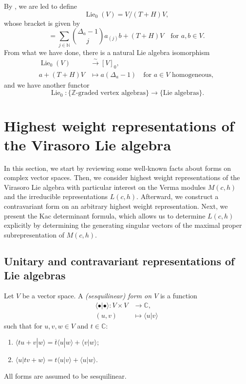 \documentclass[a4paper, 12pt, reqno]{amsart}
\theoremstyle{remark}
\DeclareMathOperator{\Lie}{Lie}
\begin{document}
By , we are led to define
\begin{equation*}
  \Lie_0(V) = V/(T + H)V,
\end{equation*}
whose bracket is given by
\begin{equation*}
  [a + (T + H)V, b + (T + H)V] = \sum_{j \in \mathbb{N}}\binom{\Delta_a - 1}{j}a_{(j)}b + (T + H)V \quad \text{for $a, b \in V$}.
\end{equation*}
From what we have done, there is a natural Lie algebra isomorphism
\begin{align*}
  \Lie_0(V) &\xrightarrow{\sim} [V]_0, \\
  a + (T + H)V &\mapsto a(\Delta_a - 1) \quad \text{for $a \in V$ homogeneous},
\end{align*}
and we have another functor
\begin{equation*}
  \Lie_0: \{\text{$\mathbb{Z}$-graded vertex algebras}\} \to \{\text{Lie algebras}\}.
\end{equation*}

\section{Highest weight representations of the Virasoro Lie algebra}
\label{sec:high-weight-repr}

In this section, we start by reviewing some well-known facts about forms on complex vector spaces.
Then, we consider highest weight representations of the Virasoro Lie algebra with particular interest on the Verma modules $M(c, h)$ and the irreducible representations $L(c, h)$.
Afterward, we construct a contravariant form on an arbitrary highest weight representation.
Next, we present the Kac determinant formula, which allows us to determine $L(c, h)$ explicitly by determining the generating singular vectors of the maximal proper subrepresentation of $M(c, h)$.

\subsection{Unitary and contravariant representations of Lie algebras}
\label{sec:unit-contr-repr}

Let $V$ be a vector space.
A \emph{(sesquilinear) form on $V$} is a function
\begin{align*}
  \langle \bullet| \bullet\rangle: V \times V &\to \mathbb{C}, \\
  (u, v) &\mapsto \langle u| v\rangle
\end{align*}
such that for $u, v, w \in V$ and $t \in \mathbb{C}$:
\begin{enumerate}
\item $\langle tu + v| w\rangle = \overline{t}\langle u| w\rangle + \langle v| w\rangle$;
\item $\langle u| tv + w\rangle = t\langle u| v\rangle + \langle u| w\rangle$.
\end{enumerate}
All forms are assumed to be sesquilinear.
\end{document}
